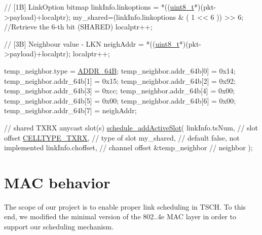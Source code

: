\begin{DoxyCodeInclude}
            \textcolor{comment}{// [1B] LinkOption bitmap}
            linkInfo.linkoptions = *((\hyperlink{_p_e___types_8h_aba7bc1797add20fe3efdf37ced1182c5}{uint8\_t}*)(pkt->payload)+localptr);
            my\_shared=(linkInfo.linkoptions & ( 1 << 6 )) >> 6; \textcolor{comment}{//Retrieve the 6-th bit (SHARED)}
            localptr++;
            
            \textcolor{comment}{// [3B] Neighbour value - LKN}
            neighAddr = *((\hyperlink{_p_e___types_8h_aba7bc1797add20fe3efdf37ced1182c5}{uint8\_t}*)(pkt->payload)+localptr);
            localptr++;

            temp\_neighbor.type         = \hyperlink{opendefs_8h_a52864abcf6ebd8d120995b36fe6ce06eaaca0da977da87a831efebdda8b376fa1}{ADDR\_64B};
            temp\_neighbor.addr\_64b[0]   = 0x14;
            temp\_neighbor.addr\_64b[1]   = 0x15;
            temp\_neighbor.addr\_64b[2]   = 0x92;
            temp\_neighbor.addr\_64b[3]   = 0xcc;
            temp\_neighbor.addr\_64b[4]   = 0x00;
            temp\_neighbor.addr\_64b[5]   = 0x00;
            temp\_neighbor.addr\_64b[6]   = 0x00;
            temp\_neighbor.addr\_64b[7]   = neighAddr;
            
            \textcolor{comment}{// shared TXRX anycast slot(s)}
            \hyperlink{group___schedule_ga00825b0f7040c67065d65aadde478241}{schedule\_addActiveSlot}(
               linkInfo.tsNum,                     \textcolor{comment}{// slot offset}
               \hyperlink{group___schedule_ggad8490d4fdf8cef27f7e5fa6a37046a3da703f29e4d2b16980f09eceaeb7a35281}{CELLTYPE\_TXRX},                      \textcolor{comment}{// type of slot}
               my\_shared,                          \textcolor{comment}{// default false, not implemented}
               linkInfo.choffset,                  \textcolor{comment}{// channel offset}
               &temp\_neighbor                      \textcolor{comment}{// neighbor}
            );
\end{DoxyCodeInclude}
 

 \hypertarget{_l_k_n_contribution_MAC_behavior}{}\section{M\+A\+C behavior}\label{_l_k_n_contribution_MAC_behavior}
The scope of our project is to enable proper link scheduling in T\+S\+CH. To this end, we modified the minimal version of the 802..\+4e M\+AC layer in order to support our scheduling mechanism.

